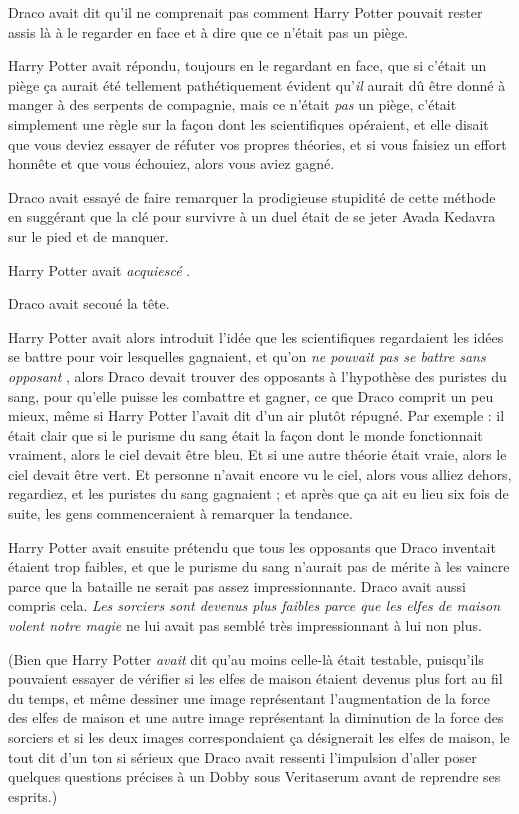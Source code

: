 Draco avait dit qu'il ne comprenait pas comment Harry Potter pouvait rester assis là à le regarder en face et à dire que ce n'était pas un piège.

Harry Potter avait répondu, toujours en le regardant en face, que si c'était un piège ça aurait été tellement pathétiquement évident qu'\emph{il}  aurait dû être donné à manger à des serpents de compagnie, mais ce n'était \emph{pas}  un piège, c'était simplement une règle sur la façon dont les scientifiques opéraient, et elle disait que vous deviez essayer de réfuter vos propres théories, et si vous faisiez un effort honnête et que vous échouiez, alors vous aviez gagné.

Draco avait essayé de faire remarquer la prodigieuse stupidité de cette méthode en suggérant que la clé pour survivre à un duel était de se jeter Avada Kedavra sur le pied et de manquer.

Harry Potter avait \emph{acquiescé} .

Draco avait secoué la tête.

Harry Potter avait alors introduit l'idée que les scientifiques regardaient les idées se battre pour voir lesquelles gagnaient, et qu'on \emph{ne pouvait pas se battre sans opposant} , alors Draco devait trouver des opposants à l'hypothèse des puristes du sang, pour qu'elle puisse les combattre et gagner, ce que Draco comprit un peu mieux, même si Harry Potter l'avait dit d'un air plutôt répugné. Par exemple : il était clair que si le purisme du sang était la façon dont le monde fonctionnait vraiment, alors le ciel devait être bleu. Et si une autre théorie était vraie, alors le ciel devait être vert. Et personne n'avait encore vu le ciel, alors vous alliez dehors, regardiez, et les puristes du sang gagnaient ; et après que ça ait eu lieu six fois de suite, les gens commenceraient à remarquer la tendance.

Harry Potter avait ensuite prétendu que tous les opposants que Draco inventait étaient trop faibles, et que le purisme du sang n'aurait pas de mérite à les vaincre parce que la bataille ne serait pas assez impressionnante. Draco avait aussi compris cela. \emph{Les sorciers sont devenus plus faibles parce que les elfes de maison volent notre magie}  ne lui avait pas semblé très impressionnant à lui non plus.

(Bien que Harry Potter \emph{avait}  dit qu'au moins celle-là était testable, puisqu'ils pouvaient essayer de vérifier si les elfes de maison étaient devenus plus fort au fil du temps, et même dessiner une image représentant l'augmentation de la force des elfes de maison et une autre image représentant la diminution de la force des sorciers et si les deux images correspondaient ça désignerait les elfes de maison, le tout dit d'un ton si sérieux que Draco avait ressenti l'impulsion d'aller poser quelques questions précises à un Dobby sous Veritaserum avant de reprendre ses esprits.)

